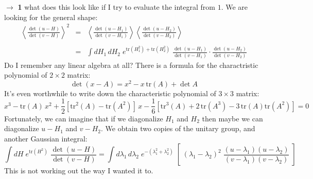 \documentclass[12pt]{article}
\begin{document}
\noindent $\to$ \textbf{1} what does this look like if I try to evaluate the integral from $1$.  We are looking for the general shape: 
\begin{eqnarray*}
\left\langle 
\frac{\det (u - H)}{\det (v - H)} \right\rangle^2 
&=& \left\langle 
\frac{\det (u - H_1)}{\det (v - H_1)} \right\rangle
\left\langle 
\frac{\det (u - H_2)}{\det (v - H_2)} \right\rangle \\\\
&=& \int dH_1 \, dH_2 \; e^{\mathrm{tr}(H_1^2) + \mathrm{tr}(H_2^2)} \;
\frac{\det (u - H_1)}{\det (v - H_1)} \cdot
\frac{\det (u - H_2)}{\det (v - H_2)} 
\end{eqnarray*}
Do I remember any linear algebra at all?   There is a formula for the charactristic polynomial of $2 \times 2$ matrix:
$$ \det (x - A) = x^2 - x\,\mathrm{tr}(A) + \det A $$
It's even worthwhile to write down the characteristic polynomial of $3 \times 3$ matrix:
$$ x^3 - \mathrm{tr}(A) \, x^2 + \frac{1}{2} \left[  \mathrm{tr}^2(A) - \mathrm{tr}(A^2)\right]\,x
- \frac{1}{6} \left[
\mathrm{tr}^3(A) + 2\, \mathrm{tr}(A^3) - 3 \,\mathrm{tr}(A) \mathrm{tr}(A^2)
 \right] =0$$
Fortunately, we can imagine that if we diagonalize $H_1$ and $H_2$ then maybe we can diagonalize $u - H_1$ and $v - H_2$.  We obtain two copies of the unitary group, and another Gaussian integral:
$$
\int dH  \; e^{\mathrm{tr}(H^2) } \;
\frac{\det (u - H)}{\det (v - H)} 
= \int d\lambda_1\, d\lambda_2 \; e^{-(\lambda_1^2 + \lambda_2^2)} \; \left[ \;
(\lambda_1 - \lambda_2)^2 \; \frac{(u - \lambda_1)(u - \lambda_2)}
{(v - \lambda_1)(v - \lambda_2)} \;\right]$$
This is not working out the way I wanted it to.
\end{document}
